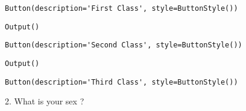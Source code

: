 \documentclass[11pt]{article}
\begin{document}
    \begin{verbatim}
Button(description='First Class', style=ButtonStyle())
    \end{verbatim}

    
    
    \begin{verbatim}
Output()
    \end{verbatim}

    
    
    \begin{verbatim}
Button(description='Second Class', style=ButtonStyle())
    \end{verbatim}

    
    
    \begin{verbatim}
Output()
    \end{verbatim}

    
    
    \begin{verbatim}
Button(description='Third Class', style=ButtonStyle())
    \end{verbatim}

    
    2. What is your sex ?
\end{document}
